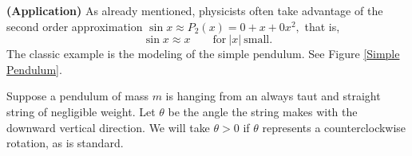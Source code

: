 
\clearpage
\bigskip 
\bex
{\bf (Application)} As already mentioned,
physicists often take advantage of the second order approximation
$\sin x\approx P_2(x)=0+x+0x^2,$
that is,
\begin{equation}\sin x\approx x\qquad\mathrm{for\ }|x|\mathrm{\ small.}
\label{SinXApproxXForXSmallForPendulum}\end{equation}
The classic example is the modeling of the simple pendulum.
See Figure \ref{Simple Pendulum}.
 
Suppose a pendulum of mass $m$
is hanging from an always taut and straight string of negligible weight.
Let $\theta$ be the angle the string makes with the downward 
vertical direction. 
We will take $\theta>0$ if $\theta$ represents a counterclockwise
rotation, as is standard.

